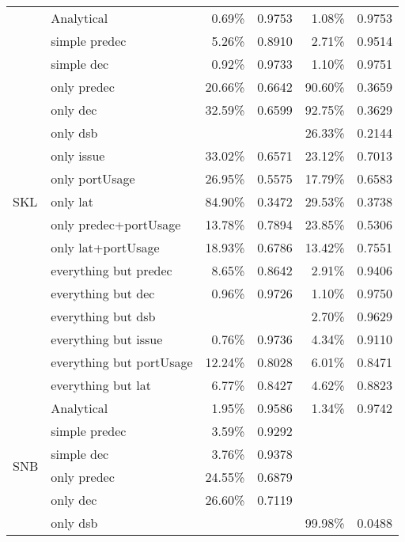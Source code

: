 \documentclass[sigconf,nonacm]{acmart}
\begin{document}
\begin{table}
\begin{center}
\begin{tabular}{llrcrc}
\midrule
\multirow{17}{*}{SKL} & Analytical & 0.69\% & 0.9753 & 1.08\% & 0.9753\\
                      & simple predec  & 5.26\% & 0.8910 & 2.71\% & 0.9514\\
                      & simple dec  & 0.92\% & 0.9733 & 1.10\% & 0.9751\\
                      & only predec  & 20.66\% & 0.6642 & 90.60\% & 0.3659\\
                      & only dec  & 32.59\% & 0.6599 & 92.75\% & 0.3629\\
                      & only dsb  & & & 26.33\% & 0.2144\\
                      & only issue  & 33.02\% & 0.6571 & 23.12\% & 0.7013\\
                      & only portUsage  & 26.95\% & 0.5575 & 17.79\% & 0.6583\\
                      & only lat  & 84.90\% & 0.3472 & 29.53\% & 0.3738\\
                      & only predec+portUsage  & 13.78\% & 0.7894 & 23.85\% & 0.5306\\
                      & only lat+portUsage  & 18.93\% & 0.6786 & 13.42\% & 0.7551\\
                      & everything but predec  & 8.65\% & 0.8642 & 2.91\% & 0.9406\\
                      & everything but dec  & 0.96\% & 0.9726 & 1.10\% & 0.9750\\
                      & everything but dsb  & & & 2.70\% & 0.9629\\
                      & everything but issue  & 0.76\% & 0.9736 & 4.34\% & 0.9110\\
                      & everything but portUsage  & 12.24\% & 0.8028 & 6.01\% & 0.8471\\
                      & everything but lat  & 6.77\% & 0.8427 & 4.62\% & 0.8823\\
\midrule
\multirow{19}{*}{SNB} & Analytical & 1.95\% & 0.9586 & 1.34\% & 0.9742\\
                      & simple predec  & 3.59\% & 0.9292 & & \\
                      & simple dec  & 3.76\% & 0.9378 & & \\
                      & only predec  & 24.55\% & 0.6879 & & \\
                      & only dec  & 26.60\% & 0.7119 & & \\
                      & only dsb  & & & 99.98\% & 0.0488\\

\end{tabular}
\end{center}
\end{table}
\end{document}
